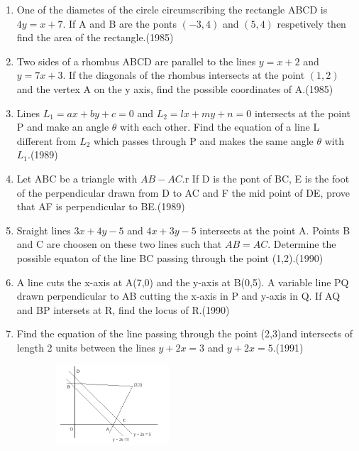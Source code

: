 \documentclass[12pt]{article}
\begin{document}
\begin{enumerate}
\item One of the diametes of the circle circumscribing the rectangle ABCD is $4y=x+7$. If A and B are the ponts $(-3,4)$ and $(5,4)$ respetively then find the area of the rectangle.(1985)\\
\item Two sides of a rhombus ABCD are parallel to the lines $y=x+2$ and $y=7x+3$. If the diagonals of the rhombus intersects at the point $(1,2)$ and the vertex A on the y axis, find the possible coordinates of A.(1985)\\
\item Lines $L_1=ax+by+c=0$ and $L_2=lx+my+n=0$ intersects at the point P and make an angle $\theta$ with each other. Find the equation of a line L different from $L_2$ which passes through P and makes the same angle $\theta$ with $L_1$.(1989)\\
\item Let ABC be a triangle with $AB-AC$.r If D is the pont of BC, E is the foot of the perpendicular drawn from D to AC and F the mid point of DE, prove that AF is perpendicular to BE.(1989)\\
\item Sraight lines $3x+4y-5$ and $4x+3y-5$ intersects at the point A. Points B and C 
are choosen on these two lines such that $AB=AC$. Determine the possible equaton of the line BC passing through the point (1,2).(1990)\\
\item A line cuts the x-axis at A(7,0) and the y-axis at B(0,5). A variable line PQ drawn perpendicular to AB cutting the x-axis  in P and y-axis in Q. If AQ and BP intersets at R, find the locus of R.(1990)\\
\item Find the equation of the line passing through the point (2,3)and intersects of length 2 units between the lines $y+2x=3$ and $y+2x=5$.(1991)\\
 
 \begin{figure}[h]
\centering
    \includegraphics[width=5cm, height=3cm]{fig.png}
     \end{figure}
     

\end{enumerate}
\end{document}
